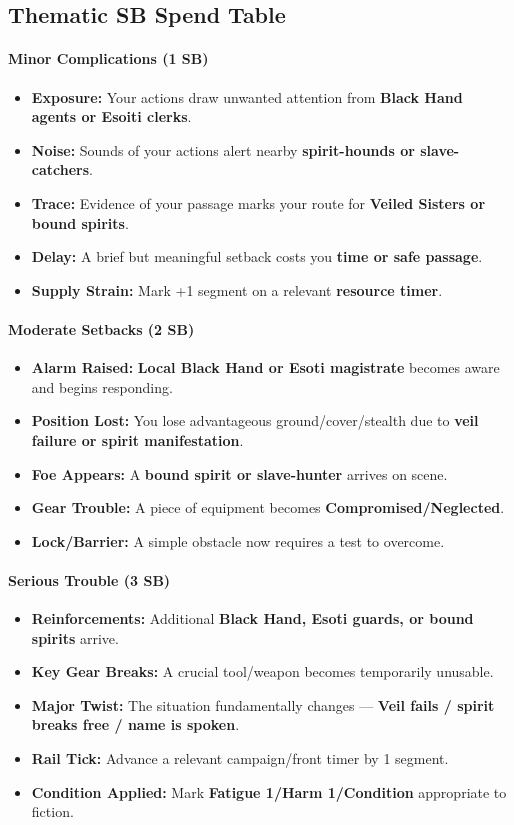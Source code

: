 \subsection*{Thematic SB Spend Table}
\label{sec:ashaan-sb}

\paragraph{Minor Complications (1 SB)}
\begin{itemize}
\item \textbf{Exposure:} Your actions draw unwanted attention from \textbf{Black Hand agents or Esoiti clerks}.
\item \textbf{Noise:} Sounds of your actions alert nearby \textbf{spirit-hounds or slave-catchers}.
\item \textbf{Trace:} Evidence of your passage marks your route for \textbf{Veiled Sisters or bound spirits}.
\item \textbf{Delay:} A brief but meaningful setback costs you \textbf{time or safe passage}.
\item \textbf{Supply Strain:} Mark +1 segment on a relevant \textbf{resource timer}.
\end{itemize}

\paragraph{Moderate Setbacks (2 SB)}
\begin{itemize}
\item \textbf{Alarm Raised:} \textbf{Local Black Hand or Esoti magistrate} becomes aware and begins responding.
\item \textbf{Position Lost:} You lose advantageous ground/cover/stealth due to \textbf{veil failure or spirit manifestation}.
\item \textbf{Foe Appears:} A \textbf{bound spirit or slave-hunter} arrives on scene.
\item \textbf{Gear Trouble:} A piece of equipment becomes \textbf{Compromised/Neglected}.
\item \textbf{Lock/Barrier:} A simple obstacle now requires a test to overcome.
\end{itemize}

\paragraph{Serious Trouble (3 SB)}
\begin{itemize}
\item \textbf{Reinforcements:} Additional \textbf{Black Hand, Esoti guards, or bound spirits} arrive.
\item \textbf{Key Gear Breaks:} A crucial tool/weapon becomes temporarily unusable.
\item \textbf{Major Twist:} The situation fundamentally changes --- \textbf{Veil fails / spirit breaks free / name is spoken}.
\item \textbf{Rail Tick:} Advance a relevant campaign/front timer by 1 segment.
\item \textbf{Condition Applied:} Mark \textbf{Fatigue 1/Harm 1/Condition} appropriate to fiction.
\end{itemize}

